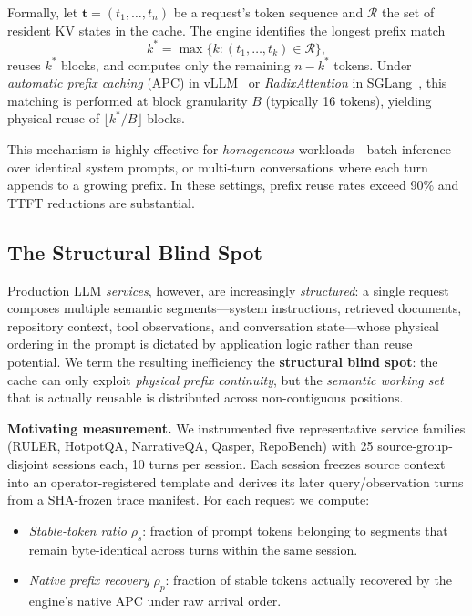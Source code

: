 \documentclass[journal]{IEEEtran}
\begin{document}
Formally, let $\mathbf{t} = (t_1, \ldots, t_n)$ be a request's token sequence and $\mathcal{R}$ the set of resident KV states in the cache. The engine identifies the longest prefix match
\begin{equation}
  k^* = \max\{k : (t_1, \ldots, t_k) \in \mathcal{R}\},
\end{equation}
reuses $k^*$ blocks, and computes only the remaining $n - k^*$ tokens. Under \emph{automatic prefix caching} (APC) in vLLM~\cite{vllm2023} or \emph{RadixAttention} in SGLang~\cite{sglang2024}, this matching is performed at block granularity $B$ (typically 16 tokens), yielding physical reuse of $\lfloor k^*/B \rfloor$ blocks.

This mechanism is highly effective for \emph{homogeneous} workloads---batch inference over identical system prompts, or multi-turn conversations where each turn appends to a growing prefix. In these settings, prefix reuse rates exceed 90\% and TTFT reductions are substantial.

\subsection{The Structural Blind Spot}

Production LLM \emph{services}, however, are increasingly \emph{structured}: a single request composes multiple semantic segments---system instructions, retrieved documents, repository context, tool observations, and conversation state---whose physical ordering in the prompt is dictated by application logic rather than reuse potential. We term the resulting inefficiency the \textbf{structural blind spot}: the cache can only exploit \emph{physical prefix continuity}, but the \emph{semantic working set} that is actually reusable is distributed across non-contiguous positions.

\smallskip
\noindent\textbf{Motivating measurement.}
We instrumented five representative service families (RULER, HotpotQA, NarrativeQA, Qasper, RepoBench) with 25 source-group-disjoint sessions each, 10 turns per session. Each session freezes source context into an operator-registered template and derives its later query/observation turns from a SHA-frozen trace manifest. For each request we compute:
\begin{itemize}
  \item \emph{Stable-token ratio} $\rho_s$: fraction of prompt tokens belonging to segments that remain byte-identical across turns within the same session.
  \item \emph{Native prefix recovery} $\rho_p$: fraction of stable tokens actually recovered by the engine's native APC under raw arrival order.
\end{itemize}
\end{document}
